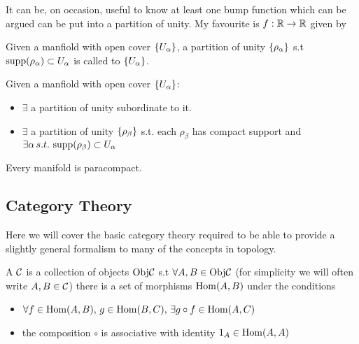 \documentclass{article}
\begin{document}
\begin{remark}
	It can be, on occasion, useful to know at least one bump function which can be argued can be put into a partition of unity. My favourite is $f: \mathbb{R} \to \mathbb{R}$ given by  
\end{remark}

\begin{definition}
	Given a manfiold with open cover $\left\{ U_\alpha \right\}$, a partition of unity $\left\{ \rho_\alpha \right\}$ s.t $\operatorname{supp}(\rho_\alpha) \subset U_\alpha$ is called  to $\left\{ U_\alpha \right\}$. 
\end{definition}

\begin{prop}
	Given a manfiold with open cover $\left\{ U_\alpha \right\}$:
	\begin{itemize}
		\item $\exists$ a partition of unity subordinate to it.
		\item $\exists$ a partition of unity $\left\{ \rho_\beta \right\}$ s.t. each $\rho_\beta$ has compact support and $\exists \alpha \, s.t. \, \operatorname{supp}(\rho_\beta) \subset U_\alpha$ 
	\end{itemize}
\end{prop}

\begin{prop}
	Every manifold is paracompact.
\end{prop}

\subsection{Category Theory}
Here we will cover the basic category theory required to be able to provide a slightly general formalism to many of the concepts in topology. 

\begin{definition}
	A  $\mathcal{C}$ is a collection of objects $\text{Obj}\mathcal{C}$ s.t $\forall A,B \in  \text{Obj}\mathcal{C}$ (for simplicity we will often write $A,B \in \mathcal{C}$) there is a set of morphisms $\operatorname{Hom}(A,B)$ under the conditions
	\begin{itemize}
		\item $\forall f \in \operatorname{Hom}(A,B), \, g \in \operatorname{Hom}(B,C), \, \exists g \circ f \in \operatorname{Hom}(A,C)$
		\item the composition $\circ$ is associative with identity $1_A \in \operatorname{Hom}(A,A)$
	\end{itemize}
\end{definition}
\end{document}
